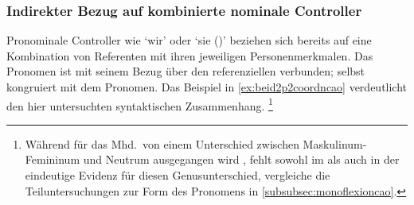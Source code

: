 \subsubsection{Indirekter Bezug auf kombinierte nominale Controller}
\label{subsubsec:beid2p2coordncao}

Pronominale Controller wie `wir' oder `sie (\Pl)' beziehen sich
bereits auf eine Kombination von Referenten mit ihren jeweiligen
Personenmerkmalen. Das Pronomen ist mit seinem Bezug über den referenziellen
\Index{} verbunden;  selbst kongruiert mit dem Pronomen. Das
Beispiel in \cref{ex:beid2p2coordncao} verdeutlicht den hier untersuchten
syntaktischen Zusammenhang.%
%
	\footnote{Während für das  Mhd.\ von einem Unterschied
		zwischen Maskulinum-Femininum  und Neutrum 
		ausgegangen wird \autocites[vgl.][213--214]{paul2007}[369,
		390--397]{ksw2}, fehlt sowohl im \CAO{} als auch in der
		\KC{} eindeutige Evidenz für diesen Genusunterschied, vergleiche
		die Teiluntersuchungen zur Form des Pronomens in
		\cref{subsubsec:monoflexioncao}.}

